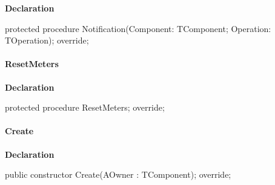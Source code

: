 \documentclass{report}
\newif\ifpdf
\begin{document}
\label{AbZipper.TAbCustomZipper-Notification}
\begin{list}{}{
\setlength{\itemindent}{0cm}
\setlength{\listparindent}{0cm}
\setlength{\leftmargin}{\evensidemargin}
\addtolength{\leftmargin}{\tmplength}
\settowidth{\labelsep}{X}
\addtolength{\leftmargin}{\labelsep}
\setlength{\labelwidth}{\tmplength}
}
\item[\textbf{Declaration}\hfill]
\ifpdf
\begin{flushleft}
\fi
\begin{ttfamily}
protected procedure Notification(Component: TComponent; Operation: TOperation); override;\end{ttfamily}

\ifpdf
\end{flushleft}
\fi

\end{list}
\paragraph*{ResetMeters}\hspace*{\fill}

\label{AbZipper.TAbCustomZipper-ResetMeters}
\begin{list}{}{
\setlength{\itemindent}{0cm}
\setlength{\listparindent}{0cm}
\setlength{\leftmargin}{\evensidemargin}
\addtolength{\leftmargin}{\tmplength}
\settowidth{\labelsep}{X}
\addtolength{\leftmargin}{\labelsep}
\setlength{\labelwidth}{\tmplength}
}
\item[\textbf{Declaration}\hfill]
\ifpdf
\begin{flushleft}
\fi
\begin{ttfamily}
protected procedure ResetMeters; override;\end{ttfamily}

\ifpdf
\end{flushleft}
\fi

\end{list}
\paragraph*{Create}\hspace*{\fill}

\label{AbZipper.TAbCustomZipper-Create}
\begin{list}{}{
\setlength{\itemindent}{0cm}
\setlength{\listparindent}{0cm}
\setlength{\leftmargin}{\evensidemargin}
\addtolength{\leftmargin}{\tmplength}
\settowidth{\labelsep}{X}
\addtolength{\leftmargin}{\labelsep}
\setlength{\labelwidth}{\tmplength}
}
\item[\textbf{Declaration}\hfill]
\ifpdf
\begin{flushleft}
\fi
\begin{ttfamily}
public constructor Create(AOwner : TComponent); override;\end{ttfamily}

\ifpdf
\end{flushleft}
\fi

\end{list}
\end{document}
